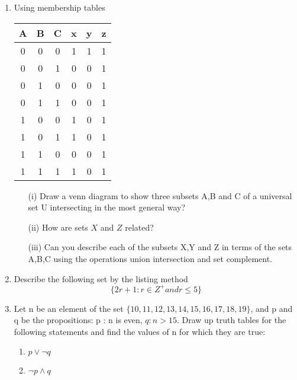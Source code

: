 \documentclass[]{article}
\begin{document}
\begin{enumerate}
\item 
Using membership tables
\begin{center}
    \begin{tabular}{|ccc|c|c|c|}
	\hline
	A & B & C & x & y & z \\\hline
	0 & 0 & 0 & 1 & 1 & 1 \\
	0 & 0 & 1 & 0 & 0 & 1 \\
	0 & 1 & 0 & 0 & 0 & 1 \\
	0 & 1 & 1 & 0 & 0 & 1 \\
	1 & 0 & 0 & 1 & 0 & 1 \\
	1 & 0 & 1 & 1 & 0 & 1 \\
	1 & 1 & 0 & 0 & 0 & 1 \\
	1 & 1 & 1 & 1 & 0 & 1 \\
	\hline
\end{tabular}
\end{center}
\begin{itemize}
	\item[(i)] Draw a venn diagram to show three subsets A,B and C of a universal set U intersecting in
	the most general way?
	\item[(ii)] How are sets $X$ and $Z$ related?
	\item[(iii)] Can you describe each of the subsets X,Y and Z in terms  of the
	sets A,B,C using the operations union intersection and set complement.
\end{itemize}


\item Describe the following set by the listing method
\[ \{ 2r+1 : r \in Z^{+} and r \leq 5  \} \]


\item 
Let n be an element of the set $\{10, 11, 12, 13, 14, 15, 16, 17, 18, 19\}$,
and p and q be the propositions:
p : n is even, $q : n > 15$.
Draw up truth tables for the following statements and find the values of n for
which they are true:
\begin{enumerate}
\item $p \vee \neg q$
\item $\neg p \wedge q$
\end{enumerate}

\end{enumerate}
\end{document}
